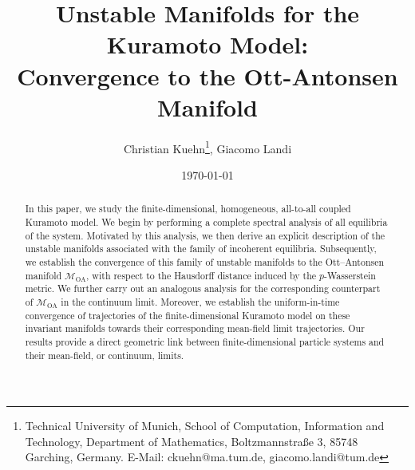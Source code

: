 \documentclass{article}
\title{Unstable Manifolds for the Kuramoto Model:\\ Convergence to the Ott-Antonsen Manifold}
\author{ Christian Kuehn\thanks{Technical University of Munich, School of Computation, Information and Technology, Department of Mathematics, Boltzmannstraße 3, 85748 Garching, Germany. E-Mail: ckuehn@ma.tum.de, giacomo.landi@tum.de}, Giacomo Landi\samethanks}
\date{\today}
\theoremstyle{definition}
\newcommand{\OA}{\mathcal{M}_{\mathrm{OA}}}
\begin{document}
\maketitle
\begin{abstract}
In this paper, we study the finite-dimensional, homogeneous, all-to-all coupled Kuramoto model. We begin by performing a complete spectral analysis of all equilibria of the system. Motivated by this analysis, we then derive an explicit description of the unstable manifolds associated with the family of incoherent equilibria. Subsequently, we establish the convergence of this family of unstable manifolds to the Ott–Antonsen manifold $\OA$, with respect to the Hausdorff distance induced by the $p$-Wasserstein metric. We further carry out an analogous analysis for the corresponding counterpart of $\OA$ in the continuum limit. Moreover, we establish the uniform-in-time convergence of trajectories of the finite-dimensional Kuramoto model on these invariant manifolds towards their corresponding mean-field limit trajectories. Our results provide a direct geometric link between finite-dimensional particle systems and their mean-field, or continuum, limits.
\end{abstract}
\end{document}
